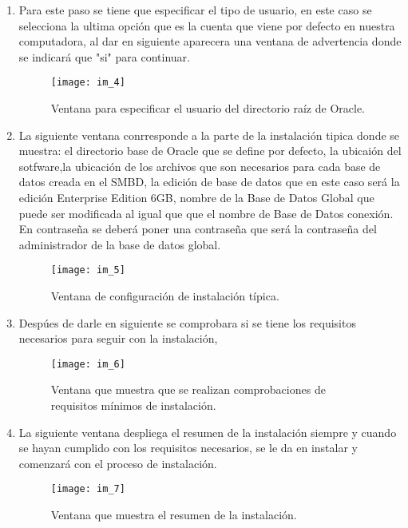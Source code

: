 \documentclass[10pt]{article}
\begin{document}
\begin{enumerate}
		
		\item Para este paso se tiene que especificar el tipo de usuario, en este caso se selecciona la ultima opción que es la cuenta que viene por defecto en nuestra computadora, al dar en siguiente aparecera una ventana de advertencia donde se indicará que "si" para continuar.
		
		\begin{figure}[H]
			\centering
		\texttt{[image: im\_4]}
		\caption{Ventana para especificar el usuario del directorio raíz de Oracle.}
	    \end{figure}
		
		\item La siguiente ventana conrresponde a la parte de la instalación tipica donde se muestra: el directorio base de Oracle que se define por defecto, la ubicaión del sotfware,la ubicación de los archivos que son necesarios para cada base de datos creada en el SMBD, la edición de base de datos que en este caso será la edición Enterprise Edition 6GB, nombre de la Base de Datos Global que puede ser modificada al igual que que el nombre de Base de Datos conexión. En contraseña se deberá poner una contraseña que será la contraseña del administrador de la base de datos global. \\
		
		\begin{figure}[H]
			\centering
		\texttt{[image: im\_5]}
		\caption{Ventana de configuración de instalación típica.}
    	\end{figure}
		
		\item Despúes de darle en siguiente se comprobara si se tiene los requisitos necesarios para seguir con la instalación,\\
		
		\begin{figure}[H]
			\centering
		\texttt{[image: im\_6]}
		\caption{Ventana que muestra que se realizan comprobaciones de requisitos mínimos de instalación. }
	    \end{figure}
	    
		\item La siguiente ventana despliega el resumen de la instalación siempre y cuando se hayan cumplido con los requisitos necesarios, se le da en instalar y comenzará con el proceso de instalación. \\
		
		\begin{figure}[H]
			\centering
		\texttt{[image: im\_7]}
		\caption{Ventana que muestra el resumen de la instalación.}
	    \end{figure}
		

\end{enumerate}
\end{document}
